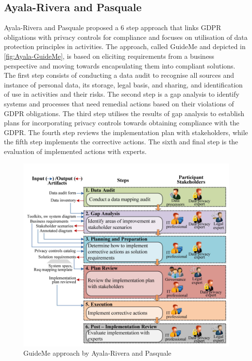 \subsection{Ayala-Rivera and Pasquale}
Ayala-Rivera and Pasquale \cite{ayala-rivera_grace_2018} proposed a 6 step approach that links GDPR obligations with privacy controls for compliance and focuses on utilisation of data protection principles in activities. The approach, called GuideMe and depicted in \autoref{fig:Ayala-GuideMe}, is based on eliciting requirements from a business perspective and moving towards encapsulating them into compliant solutions. The first step consists of conducting a data audit to recognise all sources and instance of personal data, its storage, legal basis, and sharing, and identification of use in activities and their risks. The second step is a gap analysis to identify systems and processes that need remedial actions based on their violations of GDPR obligations. The third step utilises the results of gap analysis to establish plans for incorporating privacy controls towards obtaining compliance with the GDPR. The fourth step reviews the implementation plan with stakeholders, while the fifth step implements the corrective actions. The sixth and final step is the evaluation of implemented actions with experts.
\begin{figure}[htbp]
    \centering
    \includegraphics[width=\linewidth]{img/Ayala_GuideMe.png}
    \caption{GuideMe approach by Ayala-Rivera and Pasquale \cite{ayala-rivera_grace_2018}}
    \label{fig:Ayala-GuideMe}
\end{figure}

